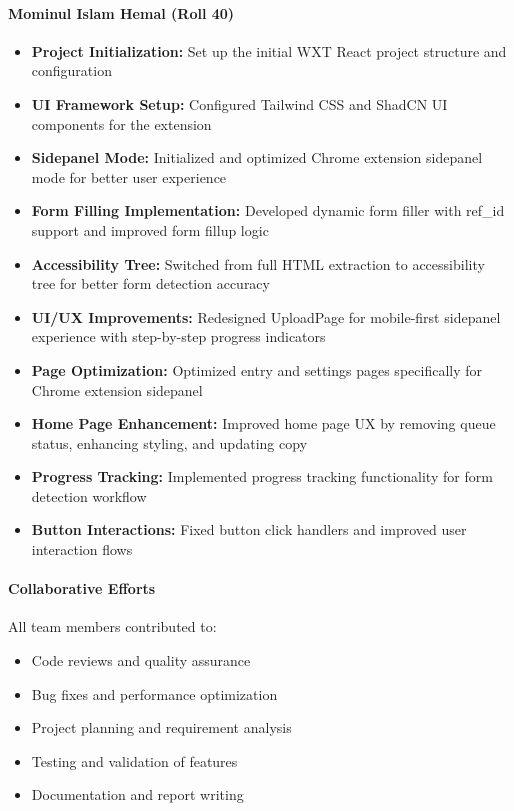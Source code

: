 \documentclass[11pt, a4paper]{article}
\theoremstyle{plain}
\theoremstyle{definition}
\begin{document}
\paragraph{Mominul Islam Hemal (Roll 40)}
\begin{itemize}
    \item \textbf{Project Initialization:} Set up the initial WXT React project structure and configuration
    \item \textbf{UI Framework Setup:} Configured Tailwind CSS and ShadCN UI components for the extension
    \item \textbf{Sidepanel Mode:} Initialized and optimized Chrome extension sidepanel mode for better user experience
    \item \textbf{Form Filling Implementation:} Developed dynamic form filler with ref\_id support and improved form fillup logic
    \item \textbf{Accessibility Tree:} Switched from full HTML extraction to accessibility tree for better form detection accuracy
    \item \textbf{UI/UX Improvements:} Redesigned UploadPage for mobile-first sidepanel experience with step-by-step progress indicators
    \item \textbf{Page Optimization:} Optimized entry and settings pages specifically for Chrome extension sidepanel
    \item \textbf{Home Page Enhancement:} Improved home page UX by removing queue status, enhancing styling, and updating copy
    \item \textbf{Progress Tracking:} Implemented progress tracking functionality for form detection workflow
    \item \textbf{Button Interactions:} Fixed button click handlers and improved user interaction flows
\end{itemize}

\paragraph{Collaborative Efforts}
All team members contributed to:
\begin{itemize}
    \item Code reviews and quality assurance
    \item Bug fixes and performance optimization
    \item Project planning and requirement analysis
    \item Testing and validation of features
    \item Documentation and report writing
\end{itemize}
\end{document}
